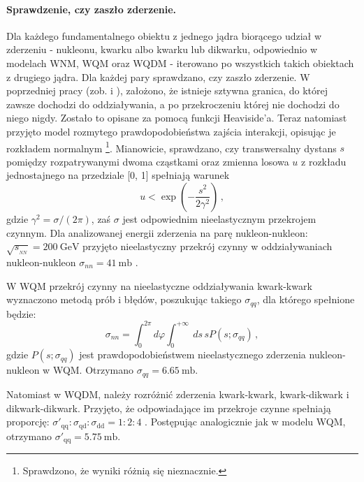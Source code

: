 \documentclass[a4paper,12pt]{article}
\begin{document}
\paragraph{Sprawdzenie, czy zaszło zderzenie.}
Dla każdego fundamentalnego obiektu z jednego jądra biorącego udział w zderzeniu - nukleonu, kwarku albo kwarku lub dikwarku, odpowiednio w modelach WNM, WQM oraz WQDM - iterowano po wszystkich takich obiektach z drugiego jądra. Dla każdej pary sprawdzano, czy zaszło zderzenie. W poprzedniej pracy (zob. \cite{Barej:pracaInz18} i \cite{Barej:2017kcw}), założono, że istnieje sztywna granica, do której zawsze dochodzi do oddziaływania, a po przekroczeniu której nie dochodzi do niego nigdy. Zostało to opisane za pomocą funkcji Heaviside'a. Teraz natomiast przyjęto model rozmytego prawdopodobieństwa zajścia interakcji, opisując je rozkładem normalnym \footnote{Sprawdzono, że wyniki różnią się nieznacznie.}. Mianowicie, sprawdzano, czy transwersalny dystans $s$ pomiędzy rozpatrywanymi dwoma cząstkami oraz zmienna losowa $u$ z rozkładu jednostajnego na przedziale [0, 1] spełniają warunek 
\begin{equation}
u < \exp\left(-\frac{s^2}{2\gamma^2}\right)\,,
\end{equation}
gdzie $\gamma^2 = \sigma/(2\pi)$, zaś $\sigma$ jest odpowiednim nieelastycznym przekrojem czynnym. Dla analizowanej energii zderzenia na parę nukleon-nukleon: $\sqrt{s_{_{NN}}} = 200~\text{GeV}$ przyjęto nieelastyczny przekrój czynny w oddziaływaniach nukleon-nukleon $\sigma_{nn} = 41~\text{mb}$ \cite{Loizides:2014vua}. 

W WQM przekrój czynny na nieelastyczne oddziaływania kwark-kwark wyznaczono metodą prób i błędów, poszukując takiego $\sigma_{qq}$, dla którego spełnione będzie: 
\begin{equation} 
\sigma_{nn} = \int_{0}^{2 \pi} d\varphi \int_{0}^{+ \infty}\:ds\,s P(s; \sigma_{qq})\,, 
\end{equation}
gdzie $P(s; \sigma_{qq})$ jest prawdopodobieństwem nieelastycznego zderzenia nukleon-nukleon w WQM. Otrzymano $\sigma_{qq} = 6.65~\text{mb}$.

Natomiast w WQDM, należy rozróżnić zderzenia kwark-kwark, kwark-dikwark i dikwark-dikwark. Przyjęto, że odpowiadające im przekroje czynne spełniają proporcję: $\sigma'_{\text{qq}}:\sigma_{\text{qd}}:\sigma_{\text{dd}}=1:2:4$ \cite{	Bialas:2006kw}. Postępując analogicznie jak w modelu WQM, otrzymano $\sigma'_{\text{qq}} = 5.75~\text{mb}$.
\end{document}
